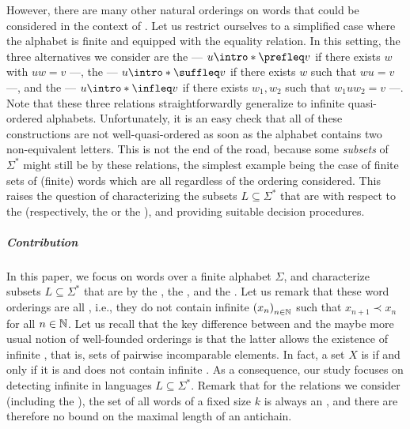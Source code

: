 \AP However, there are many other natural orderings on words that could be
considered in the context of . Let us restrict
ourselves to a simplified case where the alphabet is finite and equipped with
the equality relation. In this setting, the three alternatives we consider are
the  --- $u \intro*\prefleq v$ if there exists $w$ with
$uw = v$ ---, the  --- $u \intro*\suffleq v$ if there
exists $w$ such that $wu = v$ ---, and the  --- $u
\intro*\infleq v$ if there exists $w_1,w_2$ such that $w_1 u w_2 = v$ ---. Note
that these three relations straightforwardly generalize to infinite
quasi-ordered alphabets. Unfortunately, it is an easy check that all of these
constructions are not well-quasi-ordered as soon as the alphabet contains two
non-equivalent letters. This is not the end of the road, because some
\emph{subsets} of $\Sigma^*$ might still be  by these
relations, the simplest example being the case of finite sets of (finite) words
which are all  regardless of the ordering considered.
This raises the question of characterizing the subsets $L \subseteq \Sigma^*$
that are  with respect to the 
(respectively, the  or the ), and
providing suitable decision procedures.


\subparagraph{Contribution} \AP In this paper, we focus on words over a finite
alphabet $\Sigma$, and characterize subsets $L \subseteq \Sigma^*$ that are
 by the , the ,
and the . Let us remark that these word orderings are all
, i.e., they do not contain infinite  $\seqof{x_n}$ such that $x_{n+1} \prec x_n$ for all $n \in \mathbb{N}$.
Let us recall that the key difference between  and the
maybe more usual notion of well-founded orderings is that the latter allows the
existence of infinite , that is, sets of pairwise
incomparable elements. In fact, a set $X$ is  if and
only if it is  and does not contain infinite 
\cite{KRU72}.  As a consequence, our study focuses on detecting infinite
 in languages $L \subseteq \Sigma^*$. Remark that for the
relations we consider (including the ), the set of all
words of a fixed size $k$ is always an , and there are therefore
no bound on the maximal length of an antichain. 

